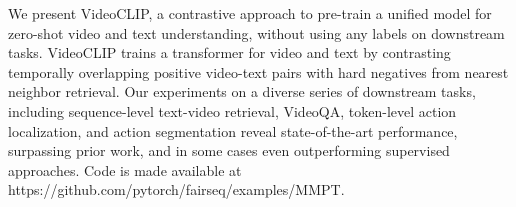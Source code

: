 We present VideoCLIP, a contrastive approach to pre-train a unified model for zero-shot video and text understanding, without using any labels on downstream tasks. VideoCLIP trains a transformer for video and text by contrasting temporally overlapping positive video-text pairs with hard negatives from nearest neighbor retrieval. Our experiments on a diverse series of  downstream  tasks, including sequence-level text-video retrieval, VideoQA, token-level action localization, and action segmentation reveal state-of-the-art performance, surpassing prior work, and in some cases even outperforming supervised approaches. Code is made available at https://github.com/pytorch/fairseq/examples/MMPT.
